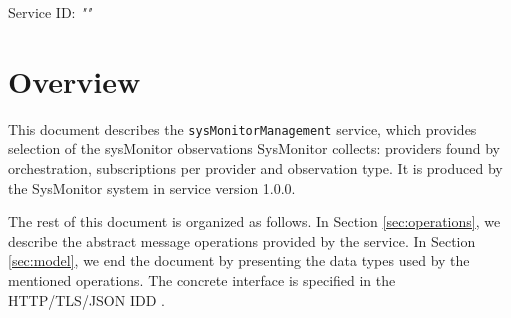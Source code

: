 \documentclass[a4paper]{arrowhead}
\begin{document}
\sloppy

\ArrowheadSetup

\begin{center}
  \vspace*{1cm}
  \huge{\arrowtitle}

  \vspace*{0.2cm}
  \LARGE{\arrowtype}
  \vspace*{1cm}

  \Large{Service ID: \textit{"\arrowid"}}

  \vspace*{\fill}


  \vspace*{1cm}
  \vspace*{\fill}

  \begin{abstract}
    This document describes the \texttt{sys\allowbreak{}Monitor\allowbreak{}Management} service, version 1.0.0, produced by the SysMonitor support system of Arrowhead 5.2.2.
  \end{abstract}

  \vspace*{1cm}
\end{center}

\newpage

\tableofcontents
\newpage

\section{Overview}
\label{sec:overview}

This document describes the \texttt{sys\allowbreak{}Monitor\allowbreak{}Management} service, which provides selection of the sysMonitor observations SysMonitor collects: providers found by orchestration, subscriptions per provider and observation type.
It is produced by the SysMonitor system \cite{smo-sysd} in service version 1.0.0.

The rest of this document is organized as follows.
In Section \ref{sec:operations}, we describe the abstract message operations provided by the service.
In Section \ref{sec:model}, we end the document by presenting the data types used by the mentioned operations.
The concrete interface is specified in the HTTP/TLS/JSON IDD \cite{smo-sysMonitorManagement-http-idd}.
\end{document}
